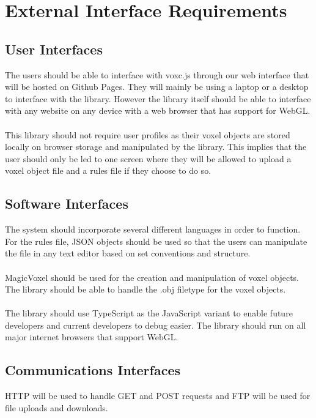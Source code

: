 \documentclass[english]{article}
\begin{document}
	\pagebreak
	
	\section{External Interface Requirements}
	
		\subsection{User Interfaces}
		The users should be able to interface with voxc.js through our web interface that will be hosted on Github Pages. They will mainly be using a laptop or a desktop to interface with the library. However the library itself should be able to interface with any website on any device with a web browser that has support for WebGL.
		\\\\
		This library should not require user profiles as their voxel objects are stored locally on browser storage and manipulated by the library. This implies that the user should only be led to one screen where they will be allowed to upload a voxel object file and a rules file if they choose to do so.
		
		\subsection{Software Interfaces}
		The system should incorporate several different languages in order to function. For the rules file, JSON objects should be 
		used so that the users can manipulate the file in any text editor based on set conventions and structure. 
		\\\\
		MagicVoxel should be used for the creation and manipulation of voxel objects. The library should be able to handle the .obj filetype for the voxel objects.
		\\\\
	 	The library should use TypeScript as the JavaScript variant to enable future developers and current developers to debug easier. The library should run on all major internet browsers that support WebGL.
		
		\subsection{Communications Interfaces}
		HTTP will be used to handle GET and POST requests and FTP will be used for file uploads and downloads.
	\pagebreak
	
\end{document}
